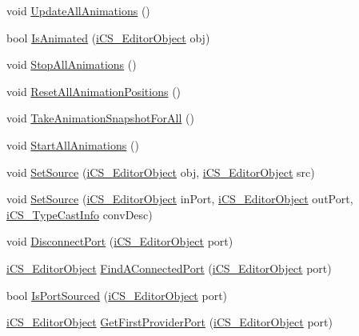 \begin{DoxyCompactItemize}
void \hyperlink{classi_c_s___i_storage_a63da66bcb4386ef81f70dde19d120554}{Update\+All\+Animations} ()
\item 
bool \hyperlink{classi_c_s___i_storage_a4488ec71eb643ea1a1e0a28763845bfe}{Is\+Animated} (\hyperlink{classi_c_s___editor_object}{i\+C\+S\+\_\+\+Editor\+Object} obj)
\item 
void \hyperlink{classi_c_s___i_storage_a8fe4697e5a3b155726c1a9679be6ccf4}{Stop\+All\+Animations} ()
\item 
void \hyperlink{classi_c_s___i_storage_abe962125040adaeb66145d6c4096220e}{Reset\+All\+Animation\+Positions} ()
\item 
void \hyperlink{classi_c_s___i_storage_a660a3091798e15b63f7c761b0673f7b0}{Take\+Animation\+Snapshot\+For\+All} ()
\item 
void \hyperlink{classi_c_s___i_storage_a415604530b760364c31abe90d13da54d}{Start\+All\+Animations} ()
\item 
void \hyperlink{classi_c_s___i_storage_a26af0bbb9dc8eeeed403825cce5f81f1}{Set\+Source} (\hyperlink{classi_c_s___editor_object}{i\+C\+S\+\_\+\+Editor\+Object} obj, \hyperlink{classi_c_s___editor_object}{i\+C\+S\+\_\+\+Editor\+Object} src)
\item 
void \hyperlink{classi_c_s___i_storage_a5f545131695ea7bf9cb932011955fe15}{Set\+Source} (\hyperlink{classi_c_s___editor_object}{i\+C\+S\+\_\+\+Editor\+Object} in\+Port, \hyperlink{classi_c_s___editor_object}{i\+C\+S\+\_\+\+Editor\+Object} out\+Port, \hyperlink{classi_c_s___type_cast_info}{i\+C\+S\+\_\+\+Type\+Cast\+Info} conv\+Desc)
\item 
void \hyperlink{classi_c_s___i_storage_a06a5aa6557bab8e1b85e74b778cc75b6}{Disconnect\+Port} (\hyperlink{classi_c_s___editor_object}{i\+C\+S\+\_\+\+Editor\+Object} port)
\item 
\hyperlink{classi_c_s___editor_object}{i\+C\+S\+\_\+\+Editor\+Object} \hyperlink{classi_c_s___i_storage_a413929ce7cd48bd91ed17d8e70bad3af}{Find\+A\+Connected\+Port} (\hyperlink{classi_c_s___editor_object}{i\+C\+S\+\_\+\+Editor\+Object} port)
\item 
bool \hyperlink{classi_c_s___i_storage_a96730b8455e726d06cd4e0747c3f4429}{Is\+Port\+Sourced} (\hyperlink{classi_c_s___editor_object}{i\+C\+S\+\_\+\+Editor\+Object} port)
\item 
\hyperlink{classi_c_s___editor_object}{i\+C\+S\+\_\+\+Editor\+Object} \hyperlink{classi_c_s___i_storage_a2d357caec0e1a1897549ef4be29b5f6f}{Get\+First\+Provider\+Port} (\hyperlink{classi_c_s___editor_object}{i\+C\+S\+\_\+\+Editor\+Object} port)

\end{DoxyCompactItemize}
